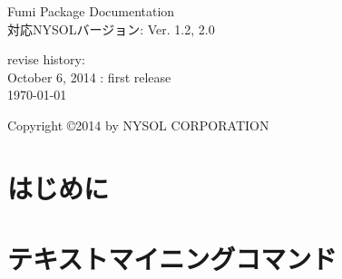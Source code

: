 \documentclass[a4paper]{jsbook}
\begin{document}
\begin{titlepage}
\begin{center}
{\huge Fumi Package Documentation}\\
\vspace{10truept}
{\normalsize 対応NYSOLバージョン: Ver. 1.2, 2.0}\\
\vspace{1cm}

revise history:\\
October 6, 2014 : first release\\
\vspace{18cm}
{\small \today}

{\small Copyright \copyright 2014 by NYSOL CORPORATION}
\end{center}
\end{titlepage}

\setcounter{tocdepth}{1}
\tableofcontents


\chapter{はじめに}




\chapter{テキストマイニングコマンド}





\end{document}
